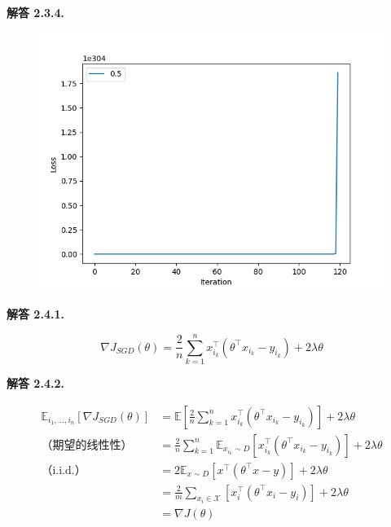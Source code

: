 \documentclass[12pt, a4paper, oneside]{ctexart}
\newenvironment{solution}[1]{\par\noindent\textbf{解答 #1. }\par}{\par}
\begin{document}
\begin{solution}{2.3.4}
\begin{figure}[htbp]
\begin{minipage}[t]{0.5\linewidth}
        \end{minipage}%
        \begin{minipage}[t]{0.5\linewidth}
        \centering
        \includegraphics[width=1.0\textwidth]{pic/Figure_4.png}
        \end{minipage}
    \end{figure}
        
\end{solution}

\begin{solution}{2.4.1}
    \begin{equation}
        \nabla J_{SGD}(\theta) = \frac{2}{n} \sum_{k=1}^{n} x_{i_k}^\top(\theta^\top x_{i_k} - y_{i_k}) + 2\lambda \theta \nonumber
    \end{equation}
\end{solution}

\begin{solution}{2.4.2}
    \begin{align}
        \mathbb{E}_{i_1, \dots, i_n} \left[ \nabla J_{SGD} (\theta) \right] & = \mathbb{E} \left[ \frac{2}{n} \sum_{k=1}^{n}  x_{i_k}^\top(\theta^\top x_{i_k} - y_{i_k}) \right]  + 2\lambda \theta \nonumber \\ 
        \text{（期望的线性性）} & = \frac{2}{n} \sum_{k=1}^{n} \mathbb{E}_{x_{i_k} \sim D} \left[  x_{i_k}^\top(\theta^\top x_{i_k} - y_{i_k}) \right] + 2\lambda \theta \nonumber \\
        \text{（i.i.d.）}& = 2\mathbb{E}_{x \sim D}\left[ x^\top (\theta^\top x - y) \right] + 2\lambda \theta \nonumber \\
        & = \frac{2}{m} \sum_{x_i \in \mathcal{X}} \left[ x_i^\top (\theta^\top x_i - y_i) \right] + 2\lambda \theta \nonumber \\
        & = \nabla J(\theta) \nonumber
    \end{align}
\end{solution}
\end{document}
